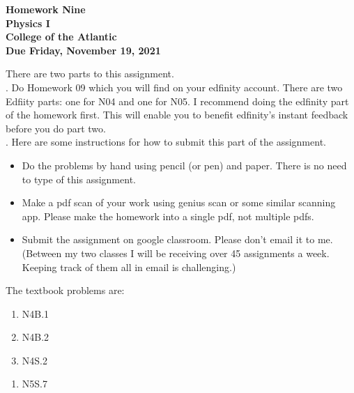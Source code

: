 \documentclass[12pt]{article}
\begin{document}
\pagestyle{empty}
 
\begin{center}
{\LARGE {\bf Homework Nine}}\\
\bigskip
{\Large {\bf Physics I}}\\
\bigskip
{\Large {\bf College of the Atlantic}}\\
\bigskip
{ {\bf Due Friday, November 19, 2021}}\\ 
\end{center}
\medskip

\noindent There are two parts to this assignment.\\


.  Do Homework 09 which you will find
on your edfinity account.  There are two Edfiity parts: one for N04
and one for N05.  I recommend doing the edfinity part of the 
homework first.  This will enable you to benefit edfinity's instant
feedback before you do part two.\\  


.  Here are some
instructions for how to submit this part of the assignment.
\begin{itemize}
\item Do the problems by hand using pencil (or pen) and paper.
  There is no need to type of this assignment.
\item Make a pdf scan of your work using genius scan or some
  similar scanning app.  Please make the homework into a single
  pdf, not multiple pdfs.
\item Submit the assignment on google classroom.  Please don't
  email it to me.  (Between my two classes I will be receiving
  over 45 assignments a week.  Keeping track of them all in email
  is challenging.)\\
\end{itemize}

\noindent The textbook problems are:\\   
 
\begin{enumerate}
  \setlength{\itemsep}{0mm}
\item N4B.1
\item N4B.2
\item N4S.2\\
\end{enumerate}

\begin{enumerate}
  \setlength{\itemsep}{0mm}
\item N5S.7
  \end{enumerate}
\end{document}
